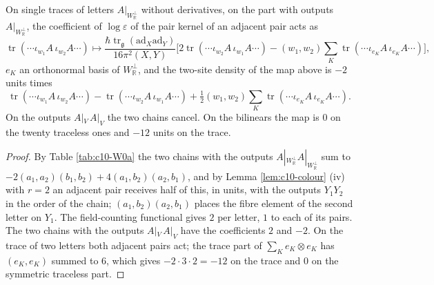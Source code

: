 \begin{proposition}
\label{prop:c10-so6}
On single traces of letters $A|_{W_{\mathbb R}^\perp}$ without derivatives, on the part with outputs $A|_{W_{\mathbb R}^\perp}$, the coefficient of $\log\varepsilon$ of the pair kernel of an adjacent pair acts as
\[
\operatorname{tr}(\cdots\iota_{w_1}A\,\iota_{w_2}A\cdots)\longmapsto\frac{\hbar\operatorname{tr}_{\mathfrak g}(\mathrm{ad}_X\mathrm{ad}_Y)}{16\pi^2(X,Y)}\Big[2\operatorname{tr}(\cdots\iota_{w_2}A\,\iota_{w_1}A\cdots)-(w_1,w_2)\sum_K\operatorname{tr}(\cdots\iota_{e_K}A\,\iota_{e_K}A\cdots)\Big],
\]
$e_K$ an orthonormal basis of $W_{\mathbb R}^\perp$, and the two-site density of the map above is $-2$ units times
\[
\operatorname{tr}(\cdots\iota_{w_1}A\,\iota_{w_2}A\cdots)-\operatorname{tr}(\cdots\iota_{w_2}A\,\iota_{w_1}A\cdots)+\tfrac12(w_1,w_2)\sum_K\operatorname{tr}(\cdots\iota_{e_K}A\,\iota_{e_K}A\cdots).
\]
On the outputs $A|_V\,A|_V$ the two chains cancel. On the bilinears the map is $0$ on the twenty traceless ones and $-12$ units on the trace.
\end{proposition}

\begin{proof}
By Table \ref{tab:c10-W0a} the two chains with the outputs $A|_{W_{\mathbb R}^\perp}A|_{W_{\mathbb R}^\perp}$ sum to $-2(a_1,a_2)(b_1,b_2)+4(a_1,b_2)(a_2,b_1)$, and by Lemma \ref{lem:c10-colour} (iv) with $r=2$ an adjacent pair receives half of this, in units, with the outputs $Y_1Y_2$ in the order of the chain; $(a_1,b_2)(a_2,b_1)$ places the fibre element of the second letter on $Y_1$. The field-counting functional gives $2$ per letter, $1$ to each of its pairs. The two chains with the outputs $A|_V\,A|_V$ have the coefficients $2$ and $-2$. On the trace of two letters both adjacent pairs act; the trace part of $\sum_Ke_K\otimes e_K$ has $(e_K,e_K)$ summed to $6$, which gives $-2\cdot3\cdot2=-12$ on the trace and $0$ on the symmetric traceless part.
\end{proof}

